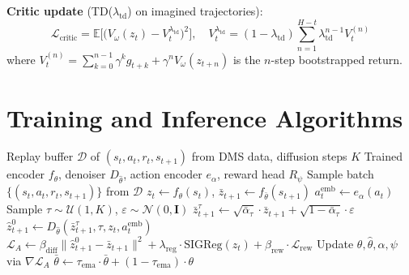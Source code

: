 \documentclass[12pt, a4paper]{article}
\begin{document}
\noindent \textbf{Critic update} (TD($\lambda_\text{td}$) on imagined trajectories):
\begin{equation}
    \mathcal{L}_\text{critic} = \mathbb{E}\Big[\big(V_\omega(z_t) - V_t^{\lambda_\text{td}}\big)^2\Big], \quad V_t^{\lambda_\text{td}} = (1-\lambda_\text{td})\sum_{n=1}^{H-t} \lambda_\text{td}^{n-1} V_t^{(n)}
\end{equation}
\noindent where $V_t^{(n)} = \sum_{k=0}^{n-1} \gamma^k g_{t+k} + \gamma^n V_\omega(z_{t+n})$ is the $n$-step bootstrapped return.


\section{Training and Inference Algorithms}
\label{app:algorithms}

\begin{algorithm}[H]
\caption{ProteinDreamer -- World Model Training (Architecture A)}
\label{alg:world_model}
\begin{algorithmic}[1]
\REQUIRE Replay buffer $\mathcal{D}$ of $(s_t, a_t, r_t, s_{t+1})$ from DMS data, diffusion steps $K$
\ENSURE Trained encoder $f_\theta$, denoiser $D_{\hat{\theta}}$, action encoder $e_\alpha$, reward head $R_\psi$
\REPEAT
    \STATE Sample batch $\{(s_t, a_t, r_t, s_{t+1})\}$ from $\mathcal{D}$
    \STATE $z_t \leftarrow f_\theta(s_t)$, \quad $\bar{z}_{t+1} \leftarrow f_{\bar{\theta}}(s_{t+1})$ 
    \STATE $a_t^\text{emb} \leftarrow e_\alpha(a_t)$
    \STATE Sample $\tau \sim \mathcal{U}(1, K)$, \quad $\varepsilon \sim \mathcal{N}(0, \mathbf{I})$
    \STATE $\bar{z}_{t+1}^\tau \leftarrow \sqrt{\bar{\alpha}_\tau} \cdot \bar{z}_{t+1} + \sqrt{1-\bar{\alpha}_\tau} \cdot \varepsilon$
    \STATE $\hat{z}_{t+1}^0 \leftarrow D_{\hat{\theta}}(\bar{z}_{t+1}^\tau, \tau, z_t, a_t^\text{emb})$
    \STATE $\mathcal{L}_A \leftarrow \beta_\text{diff}\|\hat{z}_{t+1}^0 - \bar{z}_{t+1}\|^2 + \lambda_\text{reg} \cdot \text{SIGReg}(z_t) + \beta_\text{rew} \cdot \mathcal{L}_\text{rew}$
    \STATE Update $\theta, \hat{\theta}, \alpha, \psi$ via $\nabla \mathcal{L}_A$
    \STATE $\bar{\theta} \leftarrow \tau_\text{ema} \cdot \bar{\theta} + (1 - \tau_\text{ema}) \cdot \theta$ 
\end{algorithmic}
\end{algorithm}
\end{document}
